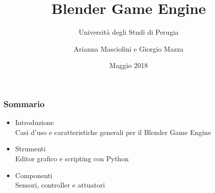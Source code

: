 \documentclass{beamer}
\title{Blender Game Engine}
\subtitle{Università degli Studi di Perugia}
\author{Arianna Masciolini e Giorgio Mazza}
\institute{UniPG}
\date{Maggio 2018}
\begin{document}
	\setcounter{showProgressBar}{0}
	\setcounter{showSlideNumbers}{0}

	\frame{\titlepage}
	\begin{frame}
		\frametitle{Sommario}
		\begin{itemize}
			\item Introduzione \\ {\footnotesize\hspace{1em} Casi d'uso e caratteristiche generali per il Blender Game Engine}
			\item Strumenti \\ {\footnotesize\hspace{1em} Editor grafico e scripting con Python}
			\item Componenti \\ {\footnotesize\hspace{1em} Sensori, controller e attuatori}
		\end{itemize}
	\end{frame}

	\setcounter{framenumber}{0}
	\setcounter{showProgressBar}{1}
	\setcounter{showSlideNumbers}{1}
\end{document}
